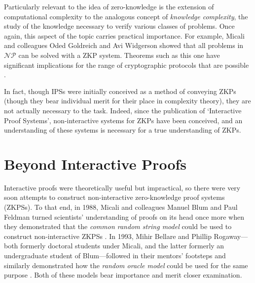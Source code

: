 \documentclass{article}
\begin{document}
\begin{adjustwidth}{0.5in}{0in}
Particularly relevant to the idea of zero-knowledge is the extension of computational complexity to the analogous concept of \textit{knowledge complexity}, the study of the knowledge necessary to verify various classes of problems. Once again, this aspect of the topic carries practical importance. For example, Micali and colleagues Oded Goldreich and Avi Widgerson showed that all problems in $\mathcal{NP}$ can be solved with a ZKP system. Theorems such as this one have significant implications for the range of cryptographic protocols that are possible \cite{GMR}.
\end{adjustwidth} \vspace{0.15in}

\noindent In fact, though IPSs were initially conceived as a method of conveying ZKPs (though they bear individual merit for their place in complexity theory), they are not actually necessary to the task. Indeed, since the publication of `Interactive Proof Systems', non-interactive systems for ZKPs have been conceived, and an understanding of these systems is necessary for a true understanding of ZKPs.


\section{Beyond Interactive Proofs}

Interactive proofs were theoretically useful but impractical, so there were very soon attempts to construct non-interactive zero-knowledge proof systems (ZKPSs). To that end, in 1988, Micali and colleagues Manuel Blum and Paul Feldman turned scientists' understanding of proofs on its head once more when they demonstrated that the \textit{common random string model} could be used to construct non-interactive ZKPSs \cite{BFM}. In 1993, Mihir Bellare and Phillip Rogaway---both formerly doctoral students under Micali, and the latter formerly an undergraduate student of Blum---followed in their mentors' footsteps and similarly demonstrated how the \textit{random oracle model} could be used for the same purpose \cite{BR}. Both of these models bear importance and merit closer examination.
\end{document}
